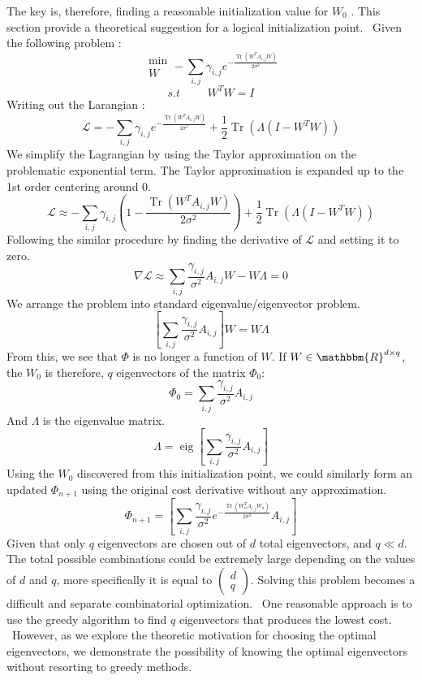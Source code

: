 \documentclass{article}
\newcommand{\tmop}[1]{\ensuremath{\operatorname{#1}}}
\begin{document}
The key is, therefore, finding a reasonable initialization value for $W_0$ .
This section provide a theoretical suggestion for a logical initialization
point. \ Given the following problem :
\[ \begin{array}{l}
     \min\\
     W
   \end{array} - \sum_{i, j} \gamma_{i, j} e^{- \frac{\tmop{Tr} (W^T A_{i, j}
   W)}{2 \sigma^2}} \]
\[ s.t \begin{array}{lll}
     &  & 
   \end{array} W^T W = I \]
Writing out the Larangian :
\[ \mathcal{L} = - \sum_{i, j} \gamma_{i, j} e^{- \frac{\tmop{Tr} (W^T A_{i,
   j} W)}{2 \sigma^2}} + \frac{1}{2} \tmop{Tr} (\Lambda (I - W^T W)) \]
We simplify the Lagrangian by using the Taylor approximation on the
problematic exponential term. The Taylor approximation is expanded up to the
1st order centering around 0.
\[ \mathcal{L} \approx - \sum_{i, j} \gamma_{i, j}  \left( 1 - \frac{\tmop{Tr}
   (W^T A_{i, j} W)}{2 \sigma^2} \right) + \frac{1}{2} \tmop{Tr} (\Lambda (I -
   W^T W)) \]
Following the similar procedure by finding the derivative of $\mathcal{L}$ and
setting it to zero.
\[ \nabla \mathcal{L} \approx \sum_{i, j} \frac{\gamma_{i, j}}{\sigma^2} A_{i,
   j} W - W \Lambda = 0 \]
We arrange the problem into standard eigenvalue/eigenvector problem.
\[ \left[ \sum_{i, j} \frac{\gamma_{i, j}}{\sigma^2} A_{i, j} \right] W = W
   \Lambda \]
From this, we see that $\Phi$ is no longer a function of $W$. If $W \in
\mathbbm{R}^{d \times q}$, the $W_0$ is therefore, $q$ eigenvectors of the
matrix $\Phi_0 $:
\[ \Phi_0 = \sum_{i, j} \frac{\gamma_{i, j}}{\sigma^2} A_{i, j} \]
And $\Lambda$ is the eigenvalue matrix.
\[ \Lambda = \tmop{eig} \left[ \sum_{i, j} \frac{\gamma_{i, j}}{\sigma^2}
   A_{i, j} \right] \]
Using the $W_0$ discovered from this initialization point, we could similarly
form an updated $\Phi_{n + 1}$ using the original cost derivative without any
approximation.
\[ \Phi_{n + 1} = \left[ \sum_{i, j} \frac{\gamma_{i, j}}{\sigma^2} e^{-
   \frac{\tmop{Tr} (W_n^T A_{i, j} W_n)}{2 \sigma^2}} A_{i, j} \right] \]
Given that only $q$ eigenvectors are chosen out of $d$ total eigenvectors, and
$q \ll d$. The total possible combinations could be extremely large depending
on the values of $d$ and $q$, more specifically it is equal to $\left(
\begin{array}{l}
  d\\
  q
\end{array} \right)$. Solving this problem becomes a difficult and separate
combinatorial optimization. \ One reasonable approach is to use the greedy
algorithm to find $q$ eigenvectors that produces the lowest cost. \ However,
as we explore the theoretic motivation for choosing the optimal eigenvectors,
we demonstrate the possibility of knowing the optimal eigenvectors without
resorting to greedy methods.
\end{document}

